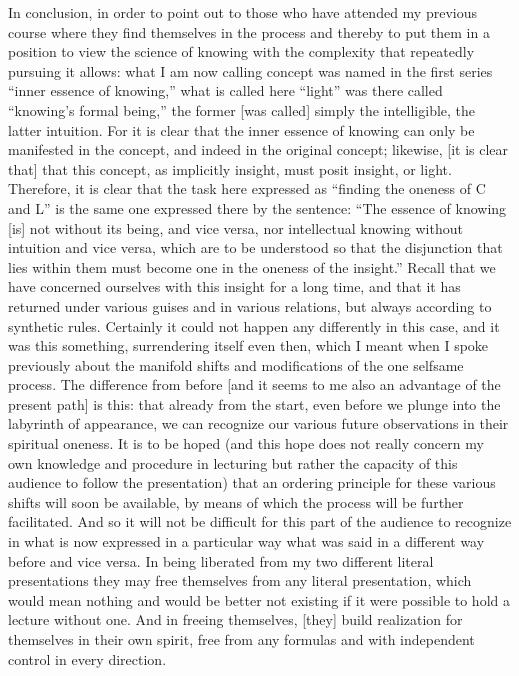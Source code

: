 In conclusion, in order to point out to those
who have attended my previous course
where they find themselves in the process
and thereby to put them in a position
to view the science of knowing with
the complexity that repeatedly pursuing it allows:
what I am now calling concept was named
in the first series “inner essence of knowing,”
what is called here “light”
was there called “knowing’s formal being,”
the former [was called] simply the intelligible,
the latter intuition.
For it is clear that the inner essence of knowing
can only be manifested in the concept,
and indeed in the original concept;
likewise, [it is clear that] that this concept,
as implicitly insight, must posit insight, or light.
Therefore, it is clear that the task here expressed as
“finding the oneness of C and L” is
the same one expressed there by the sentence:
“The essence of knowing [is] not without its being, and vice versa,
nor intellectual knowing without intuition and vice versa,
which are to be understood so that the disjunction
that lies within them must become one
in the oneness of the insight.”
Recall that we have concerned ourselves with this
insight for a long time,
and that it has returned under various guises
and in various relations, but always according to synthetic rules.
Certainly it could not happen any differently in this case,
and it was this something, surrendering itself even then,
which I meant when I spoke previously about the manifold shifts
and modifications of the one selfsame process.
The difference from before
[and it seems to me also an advantage of the present path]
is this:
that already from the start,
even before we plunge
into the labyrinth of appearance,
we can recognize our various future observations
in their spiritual oneness.
It is to be hoped
(and this hope does not really concern
my own knowledge and procedure in lecturing
but rather the capacity of this audience
to follow the presentation)
that an ordering principle for these various shifts
will soon be available,
by means of which the process will be further facilitated.
And so it will not be difficult for this part of the audience
to recognize in what is now expressed in a particular way
what was said in a different way before and vice versa.
In being liberated from my two different literal presentations
they may free themselves from any literal presentation,
which would mean nothing and would be better not existing
if it were possible to hold a lecture without one.
And in freeing themselves,
[they] build realization for themselves in their own spirit,
free from any formulas and with independent control in every direction.

